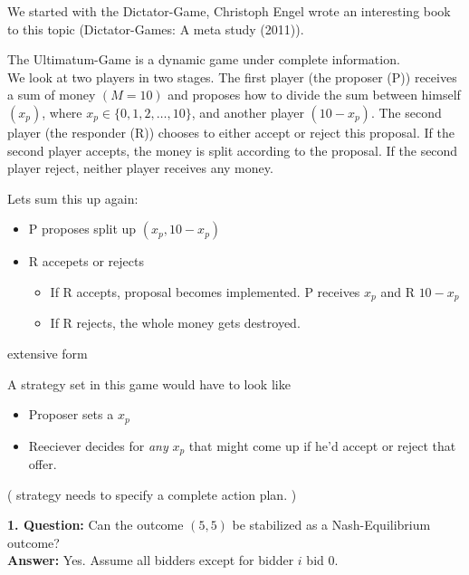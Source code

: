 
We started with the Dictator-Game, Christoph Engel wrote an interesting book to this topic (Dictator-Games: A meta study (2011)).

\begin{example}	
The Ultimatum-Game is a dynamic game under complete information. \\
We look at two players in two stages. The first player (the proposer (P)) receives a sum of money $(M = 10)$ and proposes how to divide the sum between himself $(x_{p})$, where $x_{p} \in \{ 0, 1, 2, \dotsc, 10 \}$, and another player $(10 - x_{p})$. The second player (the responder (R)) chooses to either accept or reject this proposal. If the second player accepts, the money is split according to the proposal. If the second player reject, neither player receives any money.

Lets sum this up again:
	\begin{itemize}
		\item P proposes split up $(x_{p}, 10 - x_{p})$
		\item R accepets or rejects
			\begin{itemize}
				\item If R accepts, proposal becomes implemented. P receives $x_{p}$ and R $10 - x_{p}$
				\item If R rejects, the whole money gets destroyed.
			\end{itemize}
	\end{itemize}
	
	extensive form %
	
	A strategy set in this game would have to look like
	\begin{itemize}
		\item Proposer sets a $x_{p}$
		\item Reeciever decides for \textit{any} $x_{p}$ that might come up if he'd accept or reject that offer.
	\end{itemize}
	( strategy needs to specify a complete action plan. )
	
	
	\textbf{1. Question:} Can the outcome $(5, 5)$ be stabilized as a Nash-Equilibrium outcome? \\
	\textbf{Answer:} Yes. Assume all bidders except for bidder $i$ bid $0$.	

\end{example}

\newpage